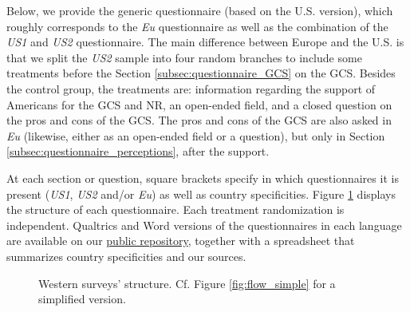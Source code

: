 Below, we provide the generic questionnaire (based on the U.S. version), which roughly corresponds to the \textit{Eu} questionnaire as well as the combination of the \textit{US1} and \textit{US2} questionnaire. The main difference between Europe and the U.S. is that we split the \textit{US2} sample into four random branches to include some treatments before the Section \ref{subsec:questionnaire_GCS} on the GCS. Besides the control group, the treatments are: information regarding the support of Americans for the GCS and NR, an open-ended field, and a closed question on the pros and cons of the GCS. The pros and cons of the GCS are also asked in \textit{Eu} (likewise, either as an open-ended field or a question), but only in Section \ref{subsec:questionnaire_perceptions}, after the support. 

At each section or question, square brackets specify in which questionnaires it is present (\textit{US1}, \textit{US2} and/or \textit{Eu}) as well as country specificities. Figure \ref{fig:flow_combined} %
displays the structure of each questionnaire. Each treatment randomization is independent. Qualtrics and Word versions of the questionnaires in each language are available on our \href{https://github.com/bixiou/international_attitudes_toward_global_policies/tree/main/questionnaire}{public repository}, together with a spreadsheet that summarizes country specificities and our sources.

\begin{figure}[h!]
    \caption[Western surveys' structure]{Western surveys' structure. Cf. Figure \ref{fig:flow_simple} for a simplified version.}\label{fig:flow_combined}
\end{figure}

